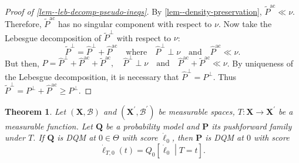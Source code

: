 \documentclass[12pt]{article}
\let\Cref\autoref
\theoremstyle{definition}
\theoremstyle{plain}
\newtheorem{theorem}{Theorem}
\begin{document}
\begin{proof}[Proof of \Cref{lem--leb-decomp-pseudo-ineqs}]
By \Cref{lem--density-preservation}, \(\tilde{P}^{\mathrm{ac}} \ll \nu\).
Therefore, \(\tilde{P}^{\mathrm{ac}}\) has no singular component with respect to
\(\nu\).
Now take the Lebesgue decomposition of \(\tilde{P}^{\perp}\) with respect to
\(\nu\):
\begin{equation*}
  \tilde{P}^{\perp} = \hat{P}^{\perp} + \hat{P}^{\mathrm{ac}} \quad \text{where}
  \quad \hat{P}^{\perp} \perp \nu \quad \text{and} \quad \hat{P}^{\mathrm{ac}}
  \ll \nu.
\end{equation*}
But then, \(P = \hat{P}^{\perp} + \hat{P}^{\mathrm{ac}} +
\tilde{P}^{\mathrm{ac}}, \quad \hat{P}^{\perp} \perp \nu \quad \text{and} \quad
\hat{P}^{\mathrm{ac}} + \tilde{P}^{\mathrm{ac}} \ll \nu\).
By uniqueness of the Lebesgue decomposition, it is necessary that
\(\hat{P}^{\perp} = P^{\perp}\).
Thus \(\tilde{P}^{\perp} = P^{\perp} + \hat{P}^{\mathrm{ac}} \geq P^{\perp}\).
\end{proof}

\begin{theorem}
\label{thm--P-dqm}
Let \((\mathbf{X}, \mathcal{B})\) and \(\left( \mathbf{X}^{\prime},
\mathcal{B}^{\prime} \right)\) be measurable spaces,
\(T : \mathbf{X} \to \mathbf{X}^{\prime}\) be a measurable function.
Let \(\mathbf{Q}\) be a probability model and \(\mathbf{P}\) its pushforward
family under \(T\).
If \(\mathbf{Q}\) is DQM at \(0 \in \Theta\) with score
\(\dot{\ell}_{0}\), then \(\mathbf{P}\) is DQM at \(0\) with score
\begin{equation}
  \dot{\ell}_{T, 0} (t) = Q_{0} \left[ \dot{\ell}_{0} \middle| T = t \right].
  \label{eqn--dotl-marg-T-def}
\end{equation}
\end{theorem}
\end{document}
